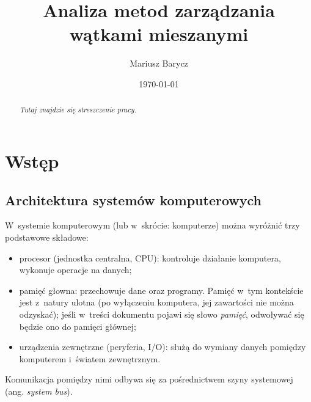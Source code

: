 \documentclass{mwart}
\author{Mariusz Barycz}
\title{Analiza metod zarządzania wątkami mieszanymi}
\date{\today}
\begin{document}
 

\maketitle
\thispagestyle{empty}

\newpage
\tableofcontents
\thispagestyle{empty}

\newpage
\setlength{\parindent}{0pt}
\setlength{\parskip}{1ex plus 0.7ex minus 0.1ex}

\begin{abstract}
	\emph{Tutaj znajdzie się streszczenie pracy.}
\end{abstract}

\newpage
%
\section{Wstęp}
%
\subsection{Architektura systemów komputerowych}
%
\indent 
	W~systemie komputerowym (lub w~skrócie: komputerze) można wyróżnić trzy podstawowe składowe:
	\begin{itemize}
		\item procesor (jednostka centralna, CPU): kontroluje działanie komputera, wykonuje operacje na danych;
		\item pamięć głowna: przechowuje dane oraz programy. Pamięć w~tym kontekście jest z~natury ulotna (po wyłączeniu komputera,
			jej zawartości nie można odzyskać); jeśli w~treści dokumentu pojawi się słowo \emph{pamięć}, odwoływać się będzie ono do
			pamięci głównej;
		\item urządzenia zewnętrzne (peryferia, I/O): służą do wymiany danych pomiędzy komputerem i~światem zewnętrznym.
	\end{itemize}
	Komunikacja pomiędzy nimi odbywa się za pośrednictwem szyny systemowej (ang. \emph{system bus}).
\par
%
\end{document}
